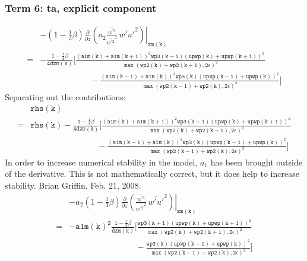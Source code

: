 \documentclass[11pt,fleqn]{article}
\newcommand{\ptlder}[2]{\frac{\partial #1}{\partial #2}}
\begin{document}
\subsubsection{Term 6:  ta, explicit component}
%
\begin{equation}
\begin{split}
& - \left. \left( 1 - \frac{1}{3}\beta \right)
       \ptlder{}{z}
         \left( 
           a_2
           \frac{\overline{w^{'3}}}{\overline{w^{'2}}^2} \,
           \overline{w'u'}^2
         \right) \right|_{\mathtt{zm(k)}} \\
=& \mathtt{
   - \frac{1 - \frac{1}{3}\beta}{4 dzm(k)}
     \bigg[ \frac{\left(a1m(k)+a1m(k+1)\right)^2 wp3(k+1) \left(upwp(k)+upwp(k+1)\right)^2}
                 {\max\left(wp2(k)+wp2(k+1),2\epsilon\right)^2} } \\
 & \mathtt{ \quad \quad \quad \quad \quad \quad
           -\frac{\left(a1m(k-1)+a1m(k)\right)^2 wp3(k) \left(upwp(k-1)+upwp(k)\right)^2}
                 {\max\left(wp2(k-1)+wp2(k),2\epsilon\right)^2}
     \bigg]
   }
\end{split}
\end{equation}
%
Separating out the contributions:
%
\begin{equation}
\begin{split}
&\mathtt{rhs(k)} \\
=& \mathtt{
   rhs(k)
   - \frac{1 - \frac{1}{3}\beta}{4 dzm(k)}
     \bigg[ \frac{\left(a1m(k)+a1m(k+1)\right)^2 wp3(k+1) \left(upwp(k)+upwp(k+1)\right)^2}
                 {\max\left(wp2(k)+wp2(k+1),2\epsilon\right)^2} } \\
 & \mathtt{ \quad \quad \quad \quad \quad \quad \quad \quad
           -\frac{\left(a1m(k-1)+a1m(k)\right)^2 wp3(k) \left(upwp(k-1)+upwp(k)\right)^2}
                 {\max\left(wp2(k-1)+wp2(k),2\epsilon\right)^2}
     \bigg]
   }
\end{split}
\end{equation}
%
In order to increase numerical stability in the model, $a_{1}$ has been brought
outside of the derivative.  This is not mathematically correct, but it does 
help to increase stability.  Brian Griffin.  Feb. 21, 2008.
% 
\begin{equation}
\begin{split}
& - \left. a_2 \left( 1 - \frac{1}{3}\beta \right)
       \ptlder{}{z}
         \left( 
           \frac{\overline{w^{'3}}}{\overline{w^{'2}}^2} \,
           \overline{w'u'}^2
         \right) \right|_{\mathtt{zm(k)}} \\
=& \mathtt{
   - a1m(k)^{2} \frac{1 - \frac{1}{3}\beta}{dzm(k)}
     \bigg[ \frac{wp3(k+1) \left(upwp(k)+upwp(k+1)\right)^2}
                 {\max\left(wp2(k)+wp2(k+1),2\epsilon\right)^2} } \\
 & \mathtt{ \quad \quad \quad \quad \qquad \qquad
           -\frac{wp3(k) \left(upwp(k-1)+upwp(k)\right)^2}
                 {\max\left(wp2(k-1)+wp2(k),2\epsilon\right)^2}
     \bigg]
   }
\end{split}
\end{equation}
\end{document}
